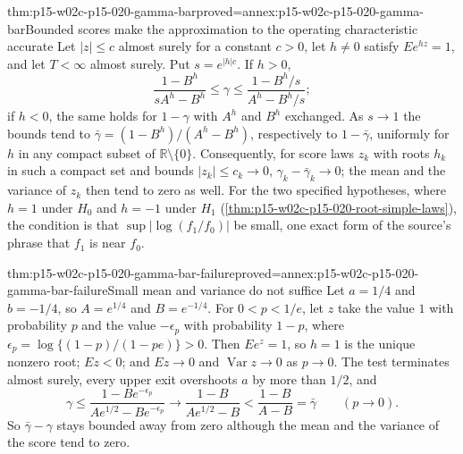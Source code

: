 \begin{hbtheorem}{thm:p15-w02c-p15-020-gamma-bar}{proved=annex:p15-w02c-p15-020-gamma-bar}{Bounded scores make the approximation to the operating characteristic accurate}
Let \(|z|\leq c\) almost surely for a constant \(c>0\), let \(h\neq0\)
satisfy \(Ee^{hz}=1\), and let \(T<\infty\) almost surely. Put
\(s=e^{|h|c}\). If \(h>0\),
\[
 \frac{1-B^h}{sA^h-B^h}\leq\gamma\leq\frac{1-B^h/s}{A^h-B^h/s};
\]
if \(h<0\), the same holds for \(1-\gamma\) with \(A^h\) and \(B^h\)
exchanged. As \(s\to1\) the bounds tend to \(\bar\gamma=(1-B^h)/(A^h-B^h)\),
respectively to \(1-\bar\gamma\), uniformly for \(h\) in any compact
subset of \(\mathbb R\setminus\{0\}\). Consequently, for score laws
\(z_k\) with roots \(h_k\) in such a compact set and bounds
\(|z_k|\leq c_k\to0\), \(\gamma_k-\bar\gamma_k\to0\); the mean and the
variance of \(z_k\) then tend to zero as well. For the two specified
hypotheses, where \(h=1\) under \(H_0\) and \(h=-1\) under \(H_1\)
(\cref{thm:p15-w02c-p15-020-root-simple-laws}), the condition is that
\(\sup|\log(f_1/f_0)|\) be small, one exact form of the source's
phrase that \(f_1\) is near \(f_0\).
\end{hbtheorem}

\begin{hbtheorem}{thm:p15-w02c-p15-020-gamma-bar-failure}{proved=annex:p15-w02c-p15-020-gamma-bar-failure}{Small mean and variance do not suffice}
Let \(a=1/4\) and \(b=-1/4\), so \(A=e^{1/4}\) and \(B=e^{-1/4}\). For
\(0<p<1/e\), let \(z\) take the value \(1\) with probability \(p\) and
the value \(-\epsilon_p\) with probability \(1-p\), where
\(\epsilon_p=\log\{(1-p)/(1-pe)\}>0\). Then \(Ee^{z}=1\), so \(h=1\) is
the unique nonzero root; \(Ez<0\); and \(Ez\to0\) and
\(\operatorname{Var}z\to0\) as \(p\to0\). The test terminates almost
surely, every upper exit overshoots \(a\) by more than \(1/2\), and
\[
 \gamma\leq\frac{1-Be^{-\epsilon_p}}{Ae^{1/2}-Be^{-\epsilon_p}}
 \longrightarrow\frac{1-B}{Ae^{1/2}-B}<\frac{1-B}{A-B}=\bar\gamma
 \qquad(p\to0).
\]
So \(\bar\gamma-\gamma\) stays bounded away from zero although the mean
and the variance of the score tend to zero.
\end{hbtheorem}

